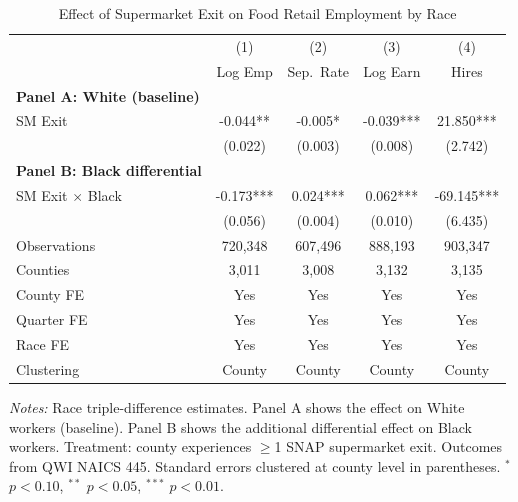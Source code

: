 \begin{table}[htbp]
\centering
\caption{Effect of Supermarket Exit on Food Retail Employment by Race}
\label{tab:main}
\begin{tabular}{lcccc}
\toprule
 & (1) & (2) & (3) & (4) \\
 & Log Emp & Sep.~Rate & Log Earn & Hires \\
\midrule
\textbf{Panel A: White (baseline)} & & & & \\
SM Exit & -0.044** & -0.005* & -0.039*** & 21.850*** \\
 & (0.022) & (0.003) & (0.008) & (2.742) \\
\addlinespace
\textbf{Panel B: Black differential} & & & & \\
SM Exit $\times$ Black & -0.173*** & 0.024*** & 0.062*** & -69.145*** \\
 & (0.056) & (0.004) & (0.010) & (6.435) \\
\addlinespace
\midrule
Observations & 720,348 & 607,496 & 888,193 & 903,347 \\
Counties & 3,011 & 3,008 & 3,132 & 3,135 \\
County FE & Yes & Yes & Yes & Yes \\
Quarter FE & Yes & Yes & Yes & Yes \\
Race FE & Yes & Yes & Yes & Yes \\
Clustering & County & County & County & County \\
\bottomrule
\end{tabular}
\begin{tablenotes}
\item \textit{Notes:} Race triple-difference estimates. Panel A shows the effect on White
workers (baseline). Panel B shows the additional differential effect on Black workers.
Treatment: county experiences $\geq$1 SNAP supermarket exit. Outcomes from QWI NAICS 445.
Standard errors clustered at county level in parentheses.
$^{*}$ $p < 0.10$, $^{**}$ $p < 0.05$, $^{***}$ $p < 0.01$.
\end{tablenotes}
\end{table}
